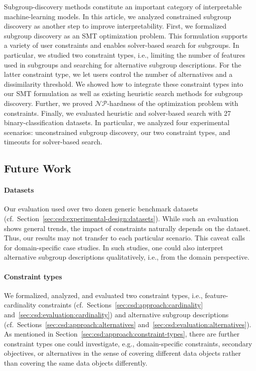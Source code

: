 \documentclass{article}
\theoremstyle{definition}
\begin{document}
Subgroup-discovery methods constitute an important category of interpretable machine-learning models.
In this article, we analyzed constrained subgroup discovery as another step to improve interpretability.
First, we formalized subgroup discovery as an SMT optimization problem.
This formulation supports a variety of user constraints and enables solver-based search for subgroups.
In particular, we studied two constraint types, i.e., limiting the number of features used in subgroups and searching for alternative subgroup descriptions.
For the latter constraint type, we let users control the number of alternatives and a dissimilarity threshold.
We showed how to integrate these constraint types into our SMT formulation as well as existing heuristic search methods for subgroup discovery.
Further, we proved $\mathcal{NP}$-hardness of the optimization problem with constraints.
Finally, we evaluated heuristic and solver-based search with 27 binary-classification datasets.
In particular, we analyzed four experimental scenarios:
unconstrained subgroup discovery, our two constraint types, and timeouts for solver-based search.

\subsection{Future Work}
\label{sec:csd:conclusion:future-work}

\paragraph{Datasets}

Our evaluation used over two dozen generic benchmark datasets (cf.~Section~\ref{sec:csd:experimental-design:datasets}).
While such an evaluation shows general trends, the impact of constraints naturally depends on the dataset.
Thus, our results may not transfer to each particular scenario.
This caveat calls for domain-specific case studies.
In such studies, one could also interpret alternative subgroup descriptions qualitatively, i.e., from the domain perspective.

\paragraph{Constraint types}

We formalized, analyzed, and evaluated two constraint types, i.e., feature-cardinality constraints (cf.~Sections~\ref{sec:csd:approach:cardinality} and~\ref{sec:csd:evaluation:cardinality}) and alternative subgroup descriptions (cf.~Sections~\ref{sec:csd:approach:alternatives} and~\ref{sec:csd:evaluation:alternatives}).
As mentioned in Section~\ref{sec:csd:approach:constraint-types}, there are further constraint types one could investigate, e.g., domain-specific constraints, secondary objectives, or alternatives in the sense of covering different data objects rather than covering the same data objects differently.
\end{document}
